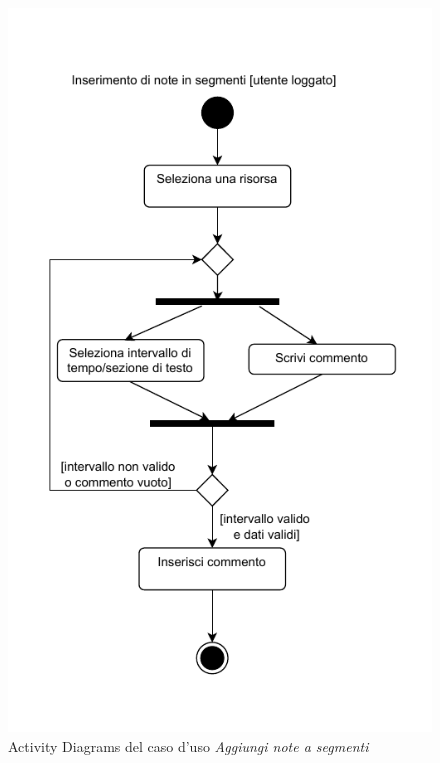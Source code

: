 \documentclass[a4paper]{article}
\begin{document}
\begin{figure}[H]
    \centering
    \includegraphics{./figures/segmenti_commenti_ac}
    \caption{Activity Diagrams del caso d'uso \textit{Aggiungi note a segmenti}}
    \label{fig:ac_note_segmenti}
\end{figure}
\end{document}
